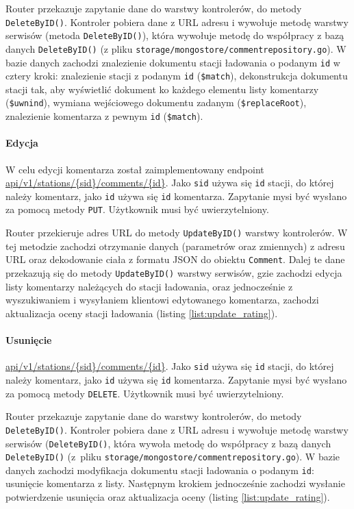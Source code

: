 Router przekazuje zapytanie dane do warstwy kontrolerów, do metody \texttt{DeleteByID()}. Kontroler pobiera dane z URL adresu i wywołuje metodę warstwy serwisów (metoda \texttt{DeleteByID()}), która wywołuje metodę do współpracy z bazą danych \texttt{DeleteByID()} (z pliku \texttt{storage/mongostore/commentrepository.go}). W bazie danych zachodzi znalezienie dokumentu stacji ładowania o podanym \texttt{id} w cztery kroki: znalezienie stacji z podanym \texttt{id} (\texttt{\$match}), dekonstrukcja dokumentu stacji tak, aby wyświetlić dokument ko każdego elementu listy komentarzy (\texttt{\$uwnind}), wymiana wejściowego dokumentu zadanym (\texttt{\$replaceRoot}), znalezienie komentarza z pewnym \texttt{id} (\texttt{\$match}).

\paragraph{Edycja\newline}
W celu edycji komentarza został zaimplementowany endpoint \url{api/v1/stations/\{sid\}/comments/{id}}. Jako \texttt{sid} używa się \texttt{{id}} stacji, do której należy komentarz, jako \texttt{{id}} używa się \texttt{id} komentarza.
Zapytanie mysi być wysłano za pomocą metody \texttt{PUT}. Użytkownik musi być uwierzytelniony.

Router przekieruje adres URL do metody \texttt{UpdateByID()} warstwy kontrolerów. W tej metodzie zachodzi otrzymanie danych (parametrów oraz zmiennych) z adresu URL oraz dekodowanie ciała z formatu JSON do obiektu \texttt{Comment}. Dalej te dane przekazują się do metody \texttt{UpdateByID()} warstwy serwisów, gzie zachodzi edycja listy komentarzy należących do stacji ładowania, oraz jednocześnie z wyszukiwaniem i wysyłaniem klientowi edytowanego komentarza, zachodzi aktualizacja oceny stacji ładowania (listing \ref{list:update_rating}).

\paragraph{Usunięcie\newline}
\url{api/v1/stations/{sid}/comments/{id}}. Jako \texttt{sid} używa się \texttt{{id}} stacji, do której należy komentarz, jako \texttt{{id}} używa się \texttt{id} komentarza.
Zapytanie mysi być wysłano za pomocą metody \texttt{DELETE}. Użytkownik musi być uwierzytelniony.

Router przekazuje zapytanie dane do warstwy kontrolerów, do metody \texttt{DeleteByID()}. Kontroler pobiera dane z URL adresu i wywołuje metodę warstwy serwisów (\texttt{DeleteByID()}, która wywoła metodę do współpracy z bazą danych \texttt{DeleteByID()} (z~pliku \texttt{storage/mongostore/commentrepository.go}). W bazie danych zachodzi modyfikacja dokumentu stacji ładowania o podanym \texttt{id}: usunięcie komentarza z listy. Następnym krokiem jednocześnie zachodzi wysłanie potwierdzenie usunięcia oraz aktualizacja oceny (listing \ref{list:update_rating}).

